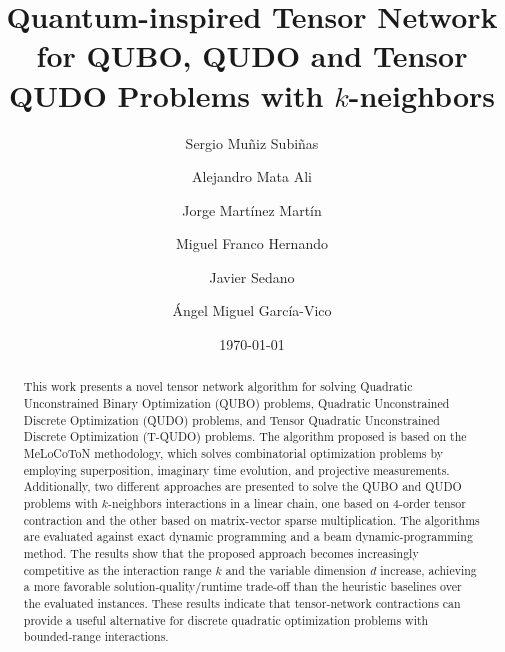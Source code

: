 \documentclass[%
 reprint,
 amsmath,amssymb,
 aps,
 pra,showkeys,
]{revtex4-2}
\begin{document}

\title{Quantum-inspired Tensor Network for QUBO, QUDO and Tensor QUDO Problems with $k$-neighbors}%

\author{Sergio Muñiz Subiñas}

\author{Alejandro Mata Ali}

\author{Jorge Martínez Martín}

\author{Miguel Franco Hernando}

\author{Javier Sedano}

\author{Ángel Miguel García-Vico}

\date{\today}%

\begin{abstract}
This work presents a novel tensor network algorithm for solving Quadratic Unconstrained Binary Optimization (QUBO) problems, Quadratic Unconstrained Discrete Optimization (QUDO) problems, and Tensor Quadratic Unconstrained Discrete Optimization (T-QUDO) problems. The algorithm proposed is based on the MeLoCoToN methodology, which solves combinatorial optimization problems by employing superposition, imaginary time evolution, and projective measurements. Additionally, two different approaches are presented to solve the QUBO and QUDO problems with $k$-neighbors interactions in a linear chain, one based on 4-order tensor contraction and the other based on matrix-vector sparse multiplication. The algorithms are evaluated against exact dynamic programming and a beam dynamic-programming method. The results show that the proposed approach becomes increasingly competitive as the interaction range $k$ and the variable dimension $d$ increase, achieving a more favorable solution-quality/runtime trade-off than the heuristic baselines over the evaluated instances. These results indicate that tensor-network contractions can provide a useful alternative for discrete quadratic optimization problems with bounded-range interactions.
\end{abstract}
\end{document}
